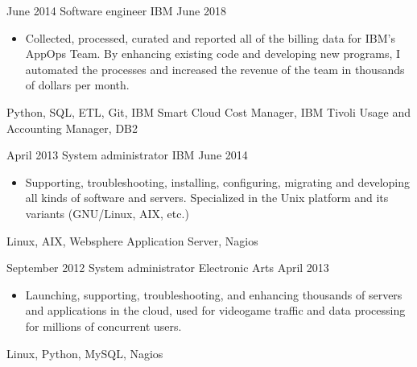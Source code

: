 \begin{experiences}
    \emptySeparator

    \experience
        {June 2014}
        {Software engineer}
        {IBM}
        {June 2018}
        {
            \begin{itemize}
                \item Collected, processed, curated and reported all of the 
                    billing data for IBM's AppOps Team. By enhancing existing 
                    code and developing new programs, I automated the processes 
                    and increased the revenue of the team in thousands of 
                    dollars per month.
            \end{itemize}
        }
        {
            Python,
            SQL,
            ETL,
            Git,
            IBM Smart Cloud Cost Manager,
            IBM Tivoli Usage and Accounting Manager,
            DB2
        }

    \emptySeparator

    \experience
        {April 2013}
        {System administrator}
        {IBM}
        {June 2014}
        {
            \begin{itemize}
                \item Supporting, troubleshooting, installing, configuring, 
                    migrating and developing all kinds of software and servers. 
                    Specialized in the Unix platform and its variants 
                    (GNU/Linux, AIX, etc.)
            \end{itemize}
        }
        {
            Linux,
            AIX,
            Websphere Application Server,
            Nagios
        }

    \emptySeparator

    \experience
        {September 2012}
        {System administrator}
        {Electronic Arts}
        {April 2013}
        {
            \begin{itemize}
                \item Launching, supporting, troubleshooting, and enhancing
                    thousands of servers and applications in the cloud, used 
                    for videogame traffic and data processing for millions of 
                    concurrent users.
            \end{itemize}
        }
        {
            Linux,
            Python,
            MySQL,
            Nagios
        }

    \emptySeparator


\end{experiences}
